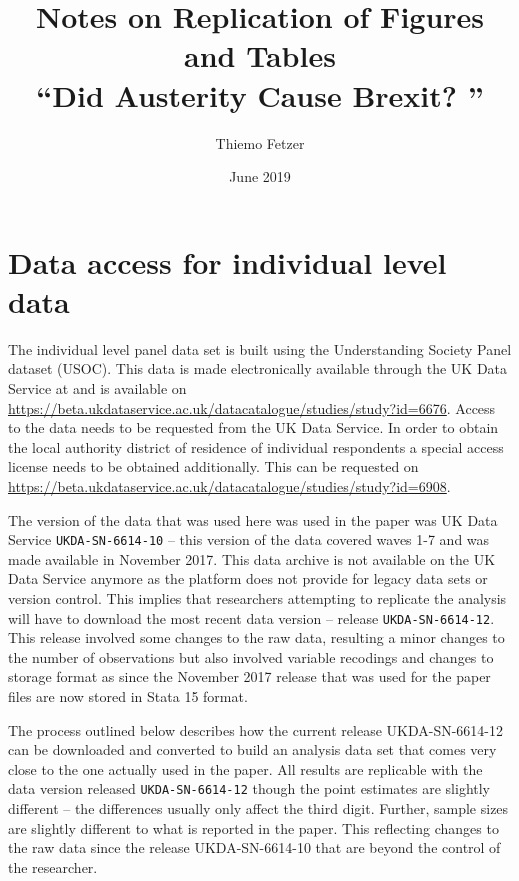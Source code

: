 \documentclass[[a4paper,11pt]{article}
\newcommand{\code}[1]{\texttt{#1}}
\begin{document}
\title{Notes on Replication of Figures and Tables \\``Did Austerity Cause Brexit? '' }
\author{ \addtocounter{footnote}{1} \setcounter{footnote}{0} Thiemo Fetzer}
\date{June 2019}

\maketitle

\section{Data access for individual level data}
The individual level panel data set is built using the \cite{Essex2018} Understanding Society Panel dataset (USOC). This data is made electronically available through the UK Data Service at and is available on \url{https://beta.ukdataservice.ac.uk/datacatalogue/studies/study?id=6676}. Access to the data needs to be requested from the UK Data Service. In order to obtain the local authority district of residence of individual respondents a special access license needs to be obtained additionally. This can be requested on \url{https://beta.ukdataservice.ac.uk/datacatalogue/studies/study?id=6908}.

The version of the data that was used here was used in the paper was UK Data Service \code{UKDA-SN-6614-10} -- this version of the data covered waves 1-7 and was made available in November 2017. This data archive is not available on the UK Data Service anymore as the platform does not provide for legacy data sets or version control. This implies that researchers attempting to replicate the analysis will have to download the most recent data version -- release \code{UKDA-SN-6614-12}. This release involved some changes to the raw data, resulting a minor changes to the number of observations but also involved variable recodings and changes to storage format as since the November 2017 release that was used for the paper files are now stored in Stata 15 format. 

The process outlined below describes how the current release UKDA-SN-6614-12 can be downloaded and converted to build an analysis data set that comes very close to the one actually used in the paper. All results are replicable with the data version released \code{UKDA-SN-6614-12} though the point estimates are slightly different -- the differences usually only affect the third digit. Further, sample sizes are slightly different to what is reported in the paper. This reflecting changes to the raw data since the release UKDA-SN-6614-10 that are beyond the control of the researcher.
\end{document}
